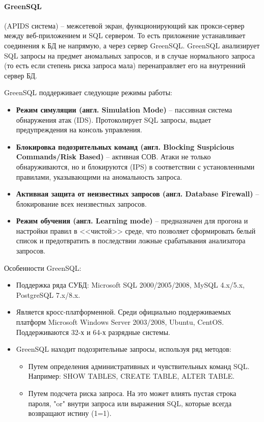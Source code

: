 \paragraph*{GreenSQL} (APIDS система) -- межсетевой экран, функционирующий как 
прокси-сервер между веб-приложением и SQL сервером. То есть приложение устанавливает 
соединения к БД не напрямую, а через сервер GreenSQL. GreenSQL анализирует SQL запросы 
на предмет аномальных запросов, и в случае нормального запроса (то есть если степень 
риска запроса мала) перенаправляет его на внутренний сервер БД.

GreenSQL поддерживает следующие режимы работы:
\begin{itemize}
	\item \textbf{Режим симуляции (англ. Simulation Mode)} -- пассивная система обнаружения 
	атак (IDS). Протоколирует SQL запросы, выдает предупреждения на консоль управления.

	\item \textbf{Блокировка подозрительных команд (англ. Blocking Suspicious Commands/Risk Based)} -- 
	активная СОВ. Атаки не только обнаруживаются, но и блокируются (IPS) в соответствии с 
	установленными правилами, указывающими на аномальность запроса.

	\item \textbf{Активная защита от неизвестных запросов (англ. Database Firewall)} -- 
	блокирование всех неизвестных запросов.

	\item \textbf{Режим обучения (англ. Learning mode)} -- предназначен для прогона и 
	настройки правил в <<чистой>> среде, что позволяет сформировать белый список и 
	предотвратить в последствии ложные срабатывания анализатора запросов.
\end{itemize}

Особенности GreenSQL:
\begin{itemize}
	\item Поддержка ряда СУБД: Microsoft SQL 2000/2005/2008, MySQL 4.x/5.x, PostgreSQL 7.x/8.x. 
	
	\item Является кросс-платформенной. Среди официально поддерживаемых платформ Microsoft 
	Windows Server 2003/2008, Ubuntu, CentOS. Поддерживаются 32-х и 64-х разрядные системы.

	\item GreenSQL находит подозрительные запросы, используя ряд методов: 
	\begin{itemize}
		\item Путем определения административных и чувствительных команд SQL. 
		Например: SHOW TABLES, CREATE TABLE, ALTER TABLE.

		\item Путем подсчета риска запроса. На это может влиять пустая строка пароля, "or" 
		внутри запроса или выражения SQL, которые всегда возвращают истину (1=1).
	\end{itemize}

\end{itemize}


